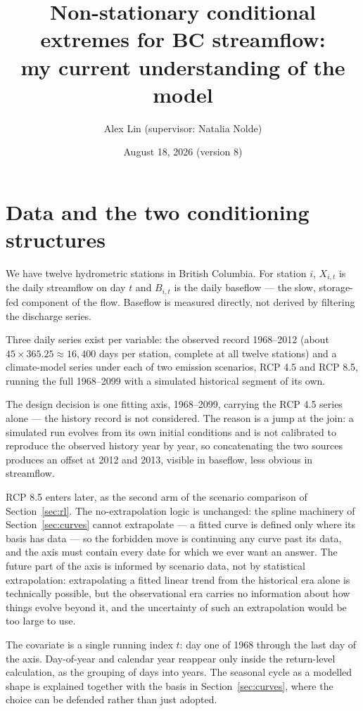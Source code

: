 \documentclass[11pt]{article}
\title{Non-stationary conditional extremes for BC streamflow:\\ my current understanding of the model}
\author{Alex Lin \quad (supervisor: Natalia Nolde)}
\date{August 18, 2026 \quad (version 8)}
\begin{document}
\maketitle


\section{Data and the two conditioning structures}\label{sec:data}

We have twelve hydrometric stations in British Columbia. For station $i$, $X_{i,t}$ is the daily streamflow on day $t$ and $B_{i,t}$ is the daily baseflow --- the slow, storage-fed component of the flow. Baseflow is measured directly, not derived by filtering the discharge series.

Three daily series exist per variable: the observed record 1968--2012 (about $45 \times 365.25 \approx 16{,}400$ days per station, complete at all twelve stations) and a climate-model series under each of two emission scenarios, RCP 4.5 and RCP 8.5, running the full 1968--2099 with a simulated historical segment of its own. 

The design decision is one fitting axis, 1968--2099, carrying the RCP 4.5 series alone --- the history record is not considered. The reason is a jump at the join: a simulated run evolves from its own initial conditions and is not calibrated to reproduce the observed history year by year, so concatenating the two sources produces an offset at 2012 and 2013, visible in baseflow, less obvious in streamflow.

RCP 8.5 enters later, as the second arm of the scenario comparison of Section~\ref{sec:rl}. The no-extrapolation logic is unchanged: the spline machinery of Section~\ref{sec:curves} cannot extrapolate --- a fitted curve is defined only where its basis has data --- so the forbidden move is continuing any curve past its data, and the axis must contain every date for which we ever want an answer. The future part of the axis is informed by scenario data, not by statistical extrapolation: extrapolating a fitted linear trend from the historical era alone is technically possible, but the observational era carries no information about how things evolve beyond it, and the uncertainty of such an extrapolation would be too large to use.

The covariate is a single running index $t$: day one of 1968 through the last day of the axis. Day-of-year and calendar year reappear only inside the return-level calculation, as the grouping of days into years. The seasonal cycle as a modelled shape is explained together with the basis in Section~\ref{sec:curves}, where the choice can be defended rather than just adopted.
\end{document}
